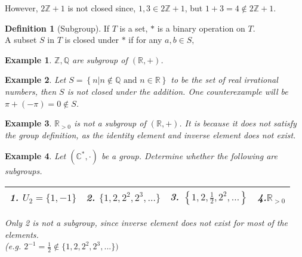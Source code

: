 \documentclass{article}
\theoremstyle{MyNonumberplain}
\theoremstyle{break}
\theoremstyle{break}
\newtheorem{example}{Example}[section]
\theoremstyle{break}
\theoremstyle{definition}
\theoremstyle{break}
\newtheorem{definition}{Definition}[section]
\begin{document}
However, $2\mathbb{Z}+ 1$ is not closed since, $1, 3 \in 2\mathbb{Z}+ 1$, but $1 + 3 = 4 \not\in 2\mathbb{Z}+ 1$.

\begin{defbox}
    \begin{definition}[Subgroup]
        If $T$ is a set, $*$ is a binary operation on $T$.\\
        A subset $S$ in $T$ is closed under $*$ if for any $a,b\in S,$
    \end{definition}
\end{defbox}

\begin{expbox}
    \begin{example}
        $\mathbb{Z}, \mathbb{Q}$ are subgroup of $(\mathbb{R}, +)$.
    \end{example}
\end{expbox}

\begin{expbox}
    \begin{example}
        Let $S = \left\{ n|n \not\in \mathbb{Q} \text{ and } n \in \mathbb{R}
\right\}$ to be the set of real irrational numbers, then $S$ is not closed
under the addition. One counterexample will be $\pi + (- \pi) = 0 \not\in
S$.
    \end{example}
\end{expbox}

\begin{expbox}
    \begin{example}
        $\mathbb{R}_{> 0}$ is not a subgroup of $(\mathbb{R}, +)$. It is because
        it does not satisfy the group definition, as the identity element and inverse
        element does not exist.
    \end{example}
\end{expbox}

\begin{expbox}
    \begin{example}
        Let $(\mathbb{C}^{\ast}, \cdot)$ be a group. Determine whether the following are subgroups.

            {\noindent}\begin{tabularx}{1.0\textwidth}{|@{}X@{}|@{}X@{}|@{}X@{}|@{}X@{}|}
            \hline
            1. $U_2 = \{ 1, - 1 \}$ & 2. $\{ 1, 2, 2^2, 2^3, \ldots \}$ & 3. $\left\{ 1, 2,
            \frac{1}{2}, 2^2, \ldots \right\}$ & 4.$\mathbb{R}_{> 0}$\\
            
            \hline

            \end{tabularx}

            \begin{ansbox}
                Only 2 is not a subgroup, since inverse element does not exist for most of the elements.\\
                (e.g. $2^{-1}=\frac{1}{2}\not\in \{1,2,2^2,2^3,...\})$
        
            \end{ansbox}
    \end{example}
\end{expbox}
\end{document}
